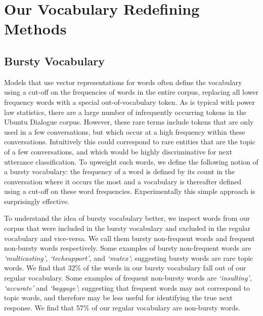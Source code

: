 \documentclass[11pt]{report}
\begin{document}
\section{Our Vocabulary Redefining Methods}\label{our_methods}

\subsection{Bursty Vocabulary}\label{bursty_vocabulary}

Models that use vector representations for words often define the vocabulary using a cut-off on the frequencies of words in the entire corpus, replacing all lower frequency words with a special out-of-vocabulary token. As is typical with power law statistics, there are a large number of infrequently occurring tokens in the Ubuntu Dialogue corpus. %
However, these rare terms include tokens that are only used in a few conversations, but which occur at a high frequency within these conversations.  Intuitively this could correspond to rare entities that are the topic of a few conversations, and which would be  highly discriminative for next utterance classification. %
To upweight such words, we define the following notion of a bursty vocabulary: the frequency of a word is defined by its count in the conversation where it occurs the most and a vocabulary is thereafter defined using a cut-off on these word frequencies.  Experimentally this simple approach is surprisingly effective.

To understand the idea of bursty vocabulary better, we inspect words from our corpus that were included in the bursty vocabulary and excluded in the regular vocabulary and vice-versa. We call them bursty non-frequent words and frequent non-bursty words respectively. Some examples of bursty non-frequent words are \textit{`multicasting', `techsupport',} and  \textit{`mutex'}; suggesting bursty words are rare topic words. We find that 32\% of the words in our bursty vocabulary fall out of our regular vocabulary.
Some examples of frequent non-bursty words are \textit{`insulting', `accurate'} and \textit{`baggage'}; suggesting that frequent words may not correspond to topic words, and therefore may be less useful for identifying the true next response. We find that 57\% of our regular vocabulary are non-bursty words.
\end{document}
